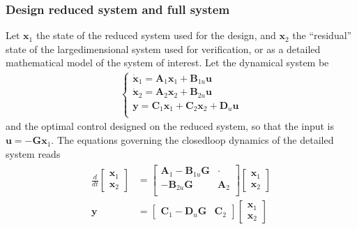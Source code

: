 \documentclass[letterpaper,10pt,english]{jupyterBook}
\begin{document}
\subsubsection{Design reduced system and full system}
\label{\detokenize{ch/control/optimal-control-regulator-observer:design-reduced-system-and-full-system}}\label{\detokenize{ch/control/optimal-control-regulator-observer:control-controller-observer-spillover-reduced-sys}}
\sphinxAtStartPar
Let \(\mathbf{x}_1\) the state of the reduced system used for the design, and \(\mathbf{x}_2\) the “residual” state of the large\sphinxhyphen{}dimensional system used for verification, or as a detailed mathematical model of the system of interest. Let the dynamical system be
\begin{equation*}
\begin{split}\begin{cases}
  \dot{\mathbf{x}}_1 = \mathbf{A}_1 \mathbf{x}_1 + \mathbf{B}_{1u} \mathbf{u} \\
  \dot{\mathbf{x}}_2 = \mathbf{A}_2 \mathbf{x}_2 + \mathbf{B}_{2u} \mathbf{u} \\
  \mathbf{y}         = \mathbf{C}_1 \mathbf{x}_1 + \mathbf{C}_2 \mathbf{x}_2 + \mathbf{D}_{u} \mathbf{u}  \\
\end{cases}\end{split}
\end{equation*}
\sphinxAtStartPar
and the optimal control designed on the reduced system, so that the input is \(\mathbf{u} = - \mathbf{G} \mathbf{x}_1\). The equations governing the closed\sphinxhyphen{}loop dynamics of the detailed system reads
\begin{equation*}
\begin{split}\begin{aligned}
\frac{d}{dt} \begin{bmatrix} \mathbf{x}_1 \\ \mathbf{x}_2 \end{bmatrix} & =
\begin{bmatrix}
\mathbf{A}_1 - \mathbf{B}_{1u} \mathbf{G} & \cdot \\
 - \mathbf{B}_{2u} \mathbf{G}  & \mathbf{A}_2  \\
\end{bmatrix}
\begin{bmatrix} \mathbf{x}_1 \\ \mathbf{x}_2 \end{bmatrix} \\
\mathbf{y} & = \begin{bmatrix} \mathbf{C}_1 - \mathbf{D}_u \mathbf{G} & \mathbf{C}_2 \end{bmatrix} \begin{bmatrix} \mathbf{x}_1 \\ \mathbf{x}_2 \end{bmatrix}
\end{aligned}\end{split}
\end{equation*}
\end{document}
